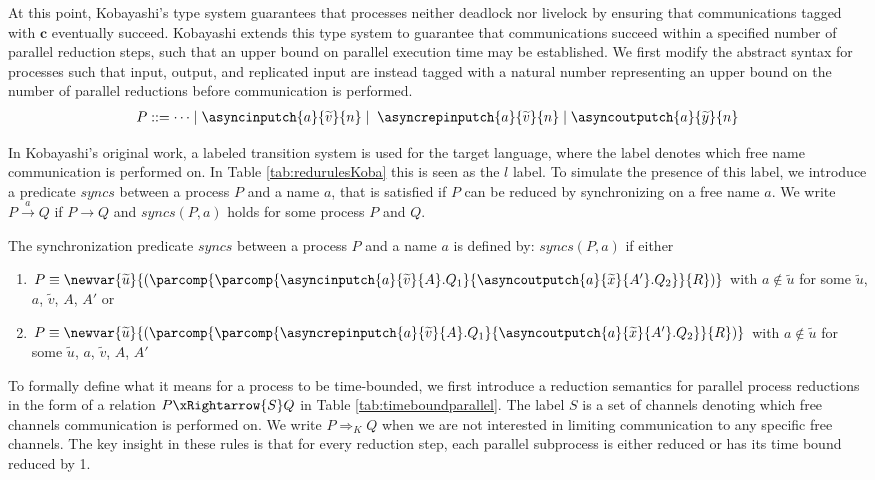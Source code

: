 At this point, Kobayashi's type system guarantees that processes neither deadlock nor livelock by ensuring that communications tagged with $\mathbf{c}$ eventually succeed. Kobayashi extends this type system to guarantee that communications succeed within a specified number of parallel reduction steps, such that an upper bound on parallel execution time may be established. We first modify the abstract syntax for processes such that input, output, and replicated input are instead tagged with a natural number representing an upper bound on the number of parallel reductions before communication is performed.
%
\begin{align*}
    P ::= \cdots \mid \asyncinputch{a}{\widetilde{v}}{n} \mid \;\asyncrepinputch{a}{\widetilde{v}}{n} \mid \asyncoutputch{a}{\widetilde{y}}{n}
\end{align*}

In Kobayashi's original work, a labeled transition system is used for the target language, where the label denotes which free name communication is performed on. In Table \ref{tab:redurulesKoba} this is seen as the $l$ label. To simulate the presence of this label, we introduce a predicate $syncs$ between a process $P$ and a name $a$, that is satisfied if $P$ can be reduced by synchronizing on a free name $a$. We write $P \xrightarrow{\;a\;} Q$ if $P \longrightarrow Q$ and $syncs(P, a)$ holds for some process $P$ and $Q$.

\begin{defi}[Synchronizes]
    The synchronization predicate $syncs$ between a process $P$ and a name $a$ is defined by:
    $syncs(P, a)$ if either
    \begin{enumerate}
        \item $P \equiv \newvar{\widetilde{u}}{(\parcomp{\parcomp{\asyncinputch{a}{\widetilde{v}}{A}.Q_1}{\asyncoutputch{a}{\widetilde{x}}{A'}.Q_2}}{R})}$ with $a \not\in {\widetilde{u}}$ for some $\widetilde{u}$, $a$, $\widetilde{v}$, $A$, $A'$ or
        \item $P \equiv \newvar{\widetilde{u}}{(\parcomp{\parcomp{\asyncrepinputch{a}{\widetilde{v}}{A}.Q_1}{\asyncoutputch{a}{\widetilde{x}}{A'}.Q_2}}{R})}$ with $a \not\in {\widetilde{u}}$ for some $\widetilde{u}$, $a$, $\widetilde{v}$, $A$, $A'$
    \end{enumerate}
\label{def:timeboundsync}
\end{defi}

To formally define what it means for a process to be time-bounded, we first introduce a reduction semantics for parallel process reductions in the form of a relation $P \xRightarrow{S} Q$ in Table \ref{tab:timeboundparallel}. The label $S$ is a set of channels denoting which free channels communication is performed on. We write $P \Rightarrow_K Q$ when we are not interested in limiting communication to any specific free channels. The key insight in these rules is that for every reduction step, each parallel subprocess is either reduced or has its time bound reduced by 1.\\

